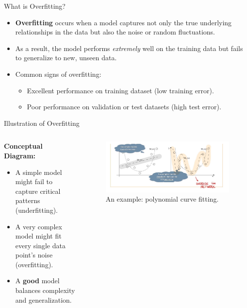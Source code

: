 \begin{frame}{What is Overfitting?}
\begin{itemize}
    \item \textbf{Overfitting} occurs when a model captures not only the true underlying relationships 
    in the data but also the noise or random fluctuations.
    \item As a result, the model performs \textit{extremely} well on the training data 
    but fails to generalize to new, unseen data.
    \item Common signs of overfitting:
    \begin{itemize}
       \item Excellent performance on training dataset (low training error).
       \item Poor performance on validation or test datasets (high test error).
    \end{itemize}
\end{itemize}
\end{frame}

\begin{frame}{Illustration of Overfitting}
\begin{columns}
    \begin{column}{0.5\textwidth}
    \textbf{Conceptual Diagram:}
    \begin{itemize}
        \item A simple model might fail to capture critical patterns (underfitting).
        \item A very complex model might fit every single data point's noise (overfitting).
        \item A \textbf{good} model balances complexity and generalization.
    \end{itemize}
    \end{column}

    \begin{column}{0.5\textwidth}
    \begin{figure}
        \includegraphics[width=\textwidth]{Images/overfitting_example.png}
        \caption{An example: polynomial curve fitting.}
    \end{figure}
    \end{column}
\end{columns}
\end{frame}

